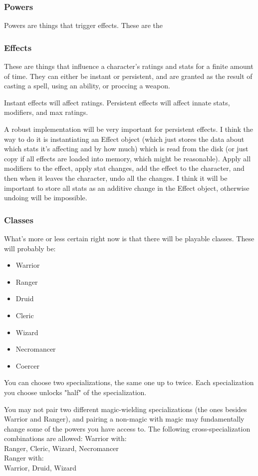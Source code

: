 \documentclass{article}
\begin{document}
\subsubsection{Powers}
Powers are things that trigger effects. These are the 

\subsubsection{Effects}
These are things that influence a character's ratings and stats for a finite amount of time.
They can either be instant or persistent, and are granted as the result of casting a spell, using an ability,
or proccing a weapon.

Instant effects will affect ratings.
Persistent effects will affect innate stats, modifiers, and max ratings.

A robust implementation will be very important for persistent effects. I think the way
to do it is instantiating
an Effect object (which just stores the data about which stats it's affecting and by how much) which is read
from the disk (or just copy if all effects are loaded into memory, which might be reasonable). Apply all
modifiers to the effect, apply stat changes, add the effect to the character, and then when it leaves the
character, undo all the changes. I think it will be important to store all stats as an additive change in the
Effect object, otherwise undoing will be impossible.


\subsubsection{Classes}
What's more or less certain right now is that there will be playable classes. These will probably be:
\begin{itemize}
    \item Warrior
    \item Ranger
    \item Druid
    \item Cleric
    \item Wizard
    \item Necromancer
    \item Coercer
\end{itemize}
You can choose two specializations, the same one up to twice. Each specialization you choose unlocks
"half" of the specialization.

You may not pair two different magic-wielding specializations (the ones besides Warrior and Ranger), and pairing
a non-magic with magic may fundamentally change some of the powers you have access to. The following
cross-specialization combinations are allowed:
Warrior with:\\
Ranger, Cleric, Wizard, Necromancer\\
Ranger with:\\
Warrior, Druid, Wizard
\end{document}
